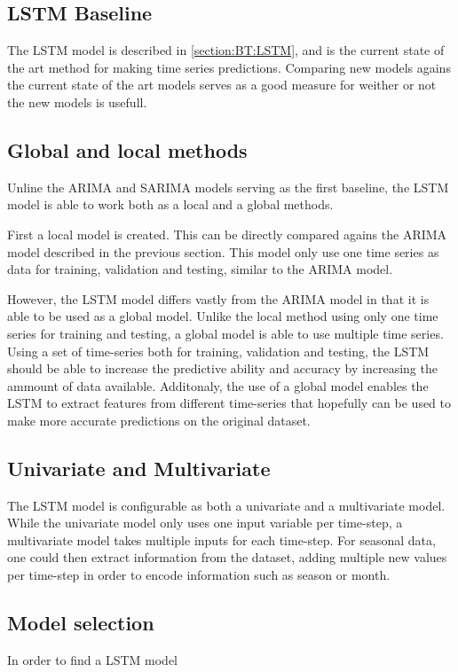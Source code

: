 

\subsection{LSTM Baseline}

The LSTM model is described in \cref{section:BT:LSTM}, and is the current state of the art method for making time series predictions.
Comparing new models agains the current state of the art models serves as a good measure for weither or not the new models is usefull.

\subsection{Global and local methods}
Unline the ARIMA and SARIMA models serving as the first baseline,
the LSTM model is able to work both as a local and a global methods.

First a local model is created. This can be directly compared agains the ARIMA model described in the previous section.
This model only use one time series as data for training, validation and testing, similar to the ARIMA model.

However, the LSTM model differs vastly from the ARIMA model in that it is able to be used as a global model.
Unlike the local method using only one time series for training and testing,
a global model is able to use multiple time series.
Using a set of time-series both for training, validation and testing,
the LSTM should be able to increase the predictive ability and accuracy by increasing the ammount of data available.
Additonaly, the use of a global model enables the LSTM to extract features from different time-series that hopefully can be used to make more accurate predictions on the original dataset.

\subsection{Univariate and Multivariate}
The LSTM model is configurable as both a univariate and a multivariate model.
While the univariate model only uses one input variable per time-step, a multivariate model takes multiple inputs for each time-step.
For seasonal data, one could then extract information from the dataset, adding multiple new values per time-step in order to encode information such as season or month.

\subsection{Model selection}
In order to find a LSTM model 

